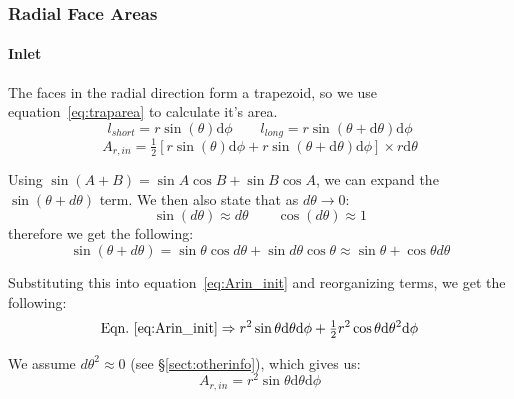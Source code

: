 \documentclass[12pt, letterpaper, twoside]{article}
\begin{document}
        \subsubsection{Radial Face Areas}
        \paragraph{Inlet}

            The faces in the radial direction form a trapezoid, so we use equation~\ref{eq:traparea} to calculate it's area.
            \begin{equation*}
                l_{short} = r\sin(\theta) \textrm{d}\phi  \qquad
                l_{long} = r\sin(\theta + \textrm{d}\theta) \textrm{d}\phi
            \end{equation*}
            \begin{equation}
                A_{r,in} = \tfrac{1}{2} [r\sin(\theta) \textrm{d}\phi + r\sin(\theta + \textrm{d}\theta) \textrm{d}\phi] \times r\textrm{d}\theta
                \label{eq:Arin_init}
            \end{equation}

            Using \(\sin(A+B) = \sin A \cos B + \sin B \cos A \), we can expand the \(\sin (\theta + d\theta)\) term. We then also state that as \(d\theta \rightarrow 0\):
            \begin{equation*}
                \sin (d\theta) \approx d\theta \qquad \cos(d\theta) \approx 1
            \end{equation*}
            therefore we get the following:
            \begin{equation*}
                \sin(\theta+d\theta) = 
                \sin\theta \cos d\theta + \sin d\theta \cos\theta \approx
                \sin\theta + \cos\theta d\theta
            \end{equation*}

            Substituting this into equation~\ref{eq:Arin_init} and reorganizing terms, we get the following:
            \begin{equation*}
                \text{Eqn.}\ \ref{eq:Arin_init} \Rightarrow
                r^2\sin\theta \textrm{d}\theta \textrm{d}\phi + \tfrac{1}{2}r^2\cos \theta \textrm{d}\theta^2 \textrm{d}\phi
            \end{equation*}

            We assume \(d\theta^2 \approx 0\) (see \S \ref{sect:otherinfo}), which gives us:
            \begin{equation}
                A_{r,in} = r^2 \sin\theta \textrm{d}\theta \textrm{d}\phi
                \label{eq:Arin_final}
            \end{equation}
\end{document}
